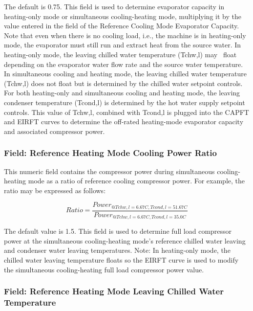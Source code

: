 The default is 0.75. This field is used to determine evaporator capacity in heating-only mode or simultaneous cooling-heating mode, multiplying it by the value entered in the field of the Reference Cooling Mode Evaporator Capacity. Note that even when there is no cooling load, i.e., the machine is in heating-only mode, the evaporator must still run and extract heat from the source water. In heating-only mode, the leaving chilled water temperature (Tchw,l) may ~float depending on the evaporator water flow rate and the source water temperature. In simultaneous cooling and heating mode, the leaving chilled water temperature (Tchw,l) does not float but is determined by the chilled water setpoint controls. For both heating-only and simultaneous cooling and heating mode, the leaving condenser temperature (Tcond,l) is determined by the hot water supply setpoint controls. This value of Tchw,l, combined with Tcond,l is plugged into the CAPFT and EIRFT curves to determine the off-rated heating-mode evaporator capacity and associated compressor power.

\subsubsection{Field: Reference Heating Mode Cooling Power Ratio}\label{field-reference-heating-mode-cooling-power-ratio}

This numeric field contains the compressor power during simultaneous cooling-heating mode as a ratio of reference cooling compressor power. For example, the ratio may be expressed as follows:

\begin{equation}
    Ratio = \frac{{Powe{r_{@Tchw,l = 6.67C,Tcond,l = 51.67C}}}}{{Powe{r_{@Tchw,l = 6.67C,Tcond,l = 35.0C}}}}
\end{equation}

The default value is 1.5. This field is used to determine full load compressor power at the simultaneous cooling-heating mode's reference chilled water leaving and condenser water leaving temperatures. Note: In heating-only mode, the chilled water leaving temperature floats so the EIRFT curve is used to modify the simultaneous cooling-heating full load compressor power value.

\subsubsection{Field: Reference Heating Mode Leaving Chilled Water Temperature}\label{field-reference-heating-mode-leaving-chilled-water-temperature}

